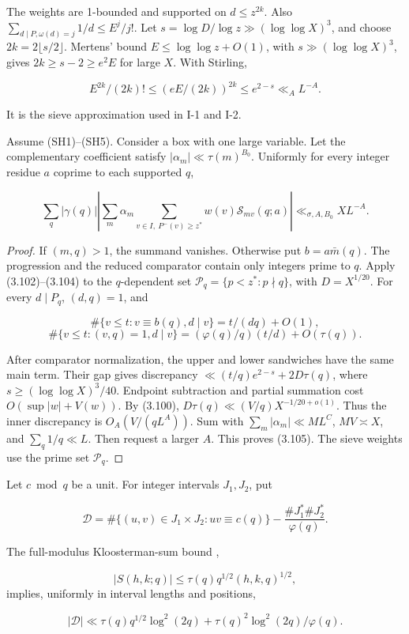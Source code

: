 The weights are 1-bounded and supported on $d\le z^{2k}$.
Also
$\sum_{d\mid P,\omega(d)=j}1/d\le E^j/j!$.
Let $s=\log D/\log z\gg(\log\log X)^3$, and choose
$2k=2\lfloor s/2\rfloor$. Mertens' bound
$E\le\log\log z+O(1)$, with $s\gg(\log\log X)^3$, gives
$2k\ge s-2\ge e^2E$ for large $X$. With Stirling,

\[
E^{2k}/(2k)!\le(eE/(2k))^{2k}\le e^{2-s}
                   \ll_A L^{-A}.
\tag{3.104}
\]

It is the sieve approximation used in I-1 and I-2.

\setcounter{lemma}{2}
\begin{lemma}\label{lem:typeI1}
Assume (SH1)--(SH5).
Consider a box with one large variable.
Let the complementary coefficient satisfy $|\alpha_m|\ll\tau(m)^{B_0}$.
Uniformly for every integer residue $a$ coprime to each supported $q$,

\[
\sum_q|\gamma(q)|\left|\sum_m\alpha_m
 \sum_{v\in I,\ P^-(v)\ge z^*}w(v)\mathcal S_{mv}(q;a)\right|
 \ll_{\sigma,A,B_0}XL^{-A}.
\tag{3.105}
\]
\end{lemma}

\begin{proof}
If $(m,q)>1$, the summand vanishes. Otherwise put
$b=a\bar m(q)$.
The progression and the reduced comparator contain only integers prime to $q$.
Apply (3.102)--(3.104) to the $q$-dependent set $\mathcal P_q=\{p<z^*:p\nmid q\}$, with
$D=X^{1/20}$. For every $d\mid P_q$, $(d,q)=1$, and

\[
\#\{v\le t:v\equiv b(q),d\mid v\}=t/(dq)+O(1),
\]
\[
\#\{v\le t:(v,q)=1,d\mid v\}
 =(\varphi(q)/q)(t/d)+O(\tau(q)).
\tag{3.106}
\]

After comparator normalization, the upper and lower sandwiches have the same main term.
Their gap gives discrepancy
$\ll(t/q)e^{2-s}+2D\tau(q)$, where
$s\ge(\log\log X)^3/40$.
Endpoint subtraction and partial summation cost $O(\sup|w|+V(w))$.
By (3.100), $D\tau(q)\ll(V/q)X^{-1/20+o(1)}$.
Thus the inner discrepancy is $O_A(V/(qL^A))$.
Sum with $\sum_m|\alpha_m|\ll ML^C$, $MV\asymp X$, and
$\sum_q1/q\ll L$. Then request a larger $A$. This proves
(3.105). The sieve weights use the prime set $\mathcal P_q$.
\end{proof}

\begin{lemma}\label{lem:hyperbola}
Let $c\bmod q$ be a unit. For integer
intervals $J_1,J_2$, put

\[
\mathcal D=\#\{(u,v)\in J_1\times J_2:uv\equiv c(q)\}
       -\frac{\#J_1^*\#J_2^*}{\varphi(q)}.
\tag{3.107}
\]

The full-modulus Kloosterman-sum bound
\cite[Corollary~11.12]{IK04},

\[
|S(h,k;q)|\le\tau(q)q^{1/2}(h,k,q)^{1/2},
\tag{3.108}
\]
implies, uniformly in interval lengths and positions,

\[
|\mathcal D|\ll\tau(q)q^{1/2}\log^2(2q)
        +\tau(q)^2\log^2(2q)/\varphi(q).
\tag{3.109}
\]
\end{lemma}

